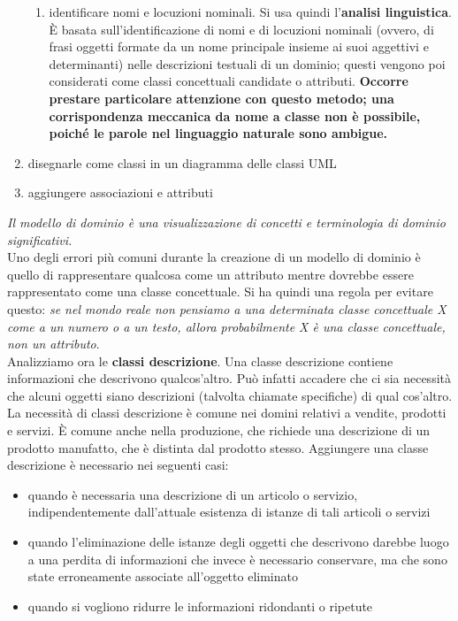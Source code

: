 \documentclass[a4paper,12pt, oneside]{book}
\begin{document}
\begin{enumerate}
\begin{enumerate}
	\item identificare nomi e locuzioni nominali. Si usa quindi l'\textbf{analisi linguistica}. È basata sull'identificazione di nomi e di locuzioni nominali (ovvero, di frasi oggetti formate da un nome principale insieme ai suoi aggettivi e determinanti) nelle descrizioni testuali di un dominio; questi vengono poi considerati come classi concettuali candidate o attributi. \textbf{Occorre prestare particolare attenzione con questo metodo; una corrispondenza meccanica da nome a classe non è possibile, poiché le parole nel linguaggio naturale sono
ambigue.}
\end{enumerate}	 
	\item disegnarle come classi in un diagramma delle classi UML
	\item aggiungere associazioni e attributi
\end{enumerate}
\textit{Il modello di dominio è una visualizzazione di concetti e terminologia di dominio significativi.}
\\
Uno degli errori più comuni durante la creazione di un modello di dominio è quello di rappresentare qualcosa come un attributo mentre dovrebbe essere rappresentato come
una classe concettuale. Si ha quindi una regola per evitare questo: \textit{se nel mondo reale non pensiamo a una determinata classe concettuale X come a un numero o a un testo, allora probabilmente X è una classe concettuale, non un attributo}.\\
Analizziamo ora le \textbf{classi descrizione}. Una classe descrizione contiene informazioni che descrivono qualcos'altro. Può infatti accadere che ci sia necessità che alcuni oggetti siano descrizioni (talvolta chiamate
specifiche) di qual cos'altro. La necessità di classi descrizione è comune nei domini relativi a vendite, prodotti e servizi. È comune anche nella produzione, che richiede una descrizione di un prodotto manufatto, che è distinta dal prodotto stesso. Aggiungere una classe descrizione è necessario nei seguenti casi:
\begin{itemize}
	\item quando è necessaria una descrizione di un articolo o servizio, indipendentemente dall'attuale esistenza di istanze di tali articoli o servizi
	\item quando l'eliminazione delle istanze degli oggetti che descrivono darebbe luogo a una perdita di informazioni che invece è necessario conservare, ma che sono state erroneamente associate all'oggetto eliminato
	\item quando si vogliono ridurre le informazioni ridondanti o ripetute
\end{itemize}
\end{document}
